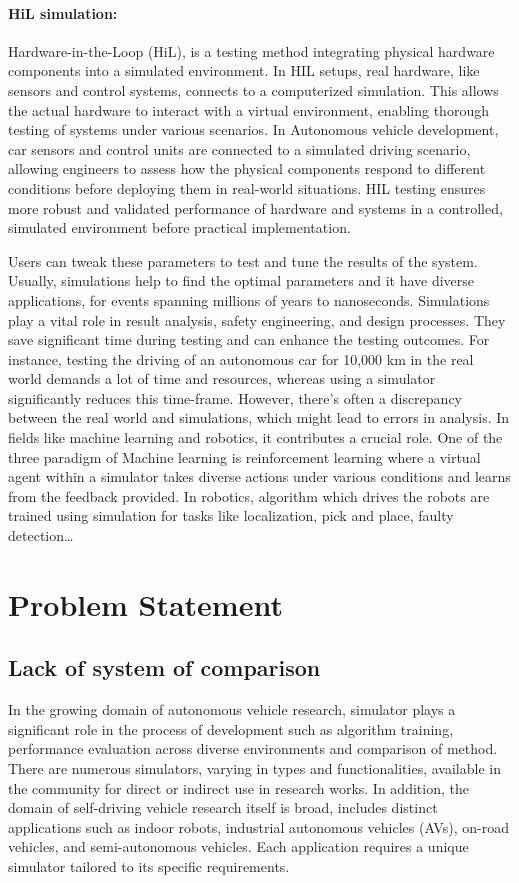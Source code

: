 \documentclass[12pt,twoside,a4paper,parskip]{scrbook} %
\begin{document}
\paragraph*{HiL simulation:} Hardware-in-the-Loop (HiL), is a testing method integrating physical hardware components into a simulated environment. In HIL setups, real hardware, like sensors and control systems, connects to a computerized simulation. This allows the actual hardware to interact with a virtual environment, enabling thorough testing of systems under various scenarios. In Autonomous vehicle development, car sensors and control units are connected to a simulated driving scenario, allowing engineers to assess how the physical components respond to different conditions before deploying them in real-world situations. HIL testing ensures more robust and validated performance of hardware and systems in a controlled, simulated environment before practical implementation.

Users can tweak these parameters to test and tune the results of the system. Usually, simulations help to find the optimal parameters and it have diverse applications, for events spanning millions of years to nanoseconds. Simulations play a vital role in result analysis, safety engineering, and design processes. They save significant time during testing and can enhance the testing outcomes. For instance, testing the driving of an autonomous car for 10,000 km in the real world demands a lot of time and resources, whereas using a simulator significantly reduces this time-frame. However, there's often a discrepancy between the real world and simulations, which might lead to errors in analysis. In fields like machine learning and robotics, it contributes a crucial role. One of the three paradigm of Machine learning is reinforcement learning where a virtual agent within a simulator takes diverse actions under various conditions and learns from the feedback provided. In robotics, algorithm which drives the robots are trained using simulation for tasks like localization, pick and place, faulty detection…
\section{Problem Statement}
\subsection{Lack of system of comparison}
In the growing domain of autonomous vehicle research, simulator plays a significant role in the process of development such as algorithm training, performance evaluation across diverse environments and comparison of method. There are numerous simulators, varying in types and functionalities, available in the community for direct or indirect use in research works. In addition, the domain of self-driving vehicle research itself is broad, includes distinct applications such as indoor robots, industrial autonomous vehicles (AVs), on-road vehicles, and semi-autonomous vehicles. Each application requires a unique simulator tailored to its specific requirements.
\end{document}
